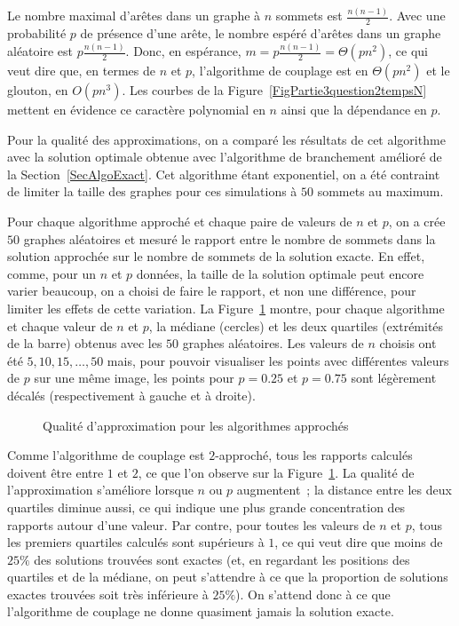 \documentclass[a4paper,11pt]{amsart}
\theoremstyle{plain}
\begin{document}
Le nombre maximal d'arêtes dans un graphe à $n$ sommets est $\frac{n(n-1)}{2}$. Avec une probabilité $p$ de présence d'une arête, le nombre espéré d'arêtes dans un graphe aléatoire est $p \frac{n(n-1)}{2}$. Donc, en espérance, $m = p \frac{n(n-1)}{2} = \Theta(p n^2)$, ce qui veut dire que, en termes de $n$ et $p$, l'algorithme de couplage est en $\Theta(p n^2)$ et le glouton, en $O(p n^3)$. Les courbes de la Figure~\ref{FigPartie3question2tempsN} mettent en évidence ce caractère polynomial en $n$ ainsi que la dépendance en $p$.

Pour la qualité des approximations, on a comparé les résultats de cet algorithme avec la solution optimale obtenue avec l'algorithme de branchement amélioré de la Section~\ref{SecAlgoExact}. Cet algorithme étant exponentiel, on a été contraint de limiter la taille des graphes pour ces simulations à $50$ sommets au maximum.

Pour chaque algorithme approché et chaque paire de valeurs de $n$ et $p$, on a crée $50$ graphes aléatoires et mesuré le rapport entre le nombre de sommets dans la solution approchée sur le nombre de sommets de la solution exacte. En effet, comme, pour un $n$ et $p$ données, la taille de la solution optimale peut encore varier beaucoup, on a choisi de faire le rapport, et non une différence, pour limiter les effets de cette variation. La Figure~\ref{FigPartie3question2qualite} montre, pour chaque algorithme et chaque valeur de $n$ et $p$, la médiane (cercles) et les deux quartiles (extrémités de la barre) obtenus avec les $50$ graphes aléatoires. Les valeurs de $n$ choisis ont été $5, 10, 15, \dotsc, 50$ mais, pour pouvoir visualiser les points avec différentes valeurs de $p$ sur une même image, les points pour $p = 0.25$ et $p = 0.75$ sont légèrement décalés (respectivement à gauche et à droite).

\begin{figure}[ht]
\centering
\resizebox{\textwidth}{!}{}
\caption{Qualité d'approximation pour les algorithmes approchés}
\label{FigPartie3question2qualite}
\end{figure}

Comme l'algorithme de couplage est $2$-approché, tous les rapports calculés doivent être entre $1$ et $2$, ce que l'on observe sur la Figure~\ref{FigPartie3question2qualite}. La qualité de l'approximation s'améliore lorsque $n$ ou $p$ augmentent~; la distance entre les deux quartiles diminue aussi, ce qui indique une plus grande concentration des rapports autour d'une valeur. Par contre, pour toutes les valeurs de $n$ et $p$, tous les premiers quartiles calculés sont supérieurs à $1$, ce qui veut dire que moins de $25\%$ des solutions trouvées sont exactes (et, en regardant les positions des quartiles et de la médiane, on peut s'attendre à ce que la proportion de solutions exactes trouvées soit très inférieure à $25\%$). On s'attend donc à ce que l'algorithme de couplage ne donne quasiment jamais la solution exacte.
\end{document}
